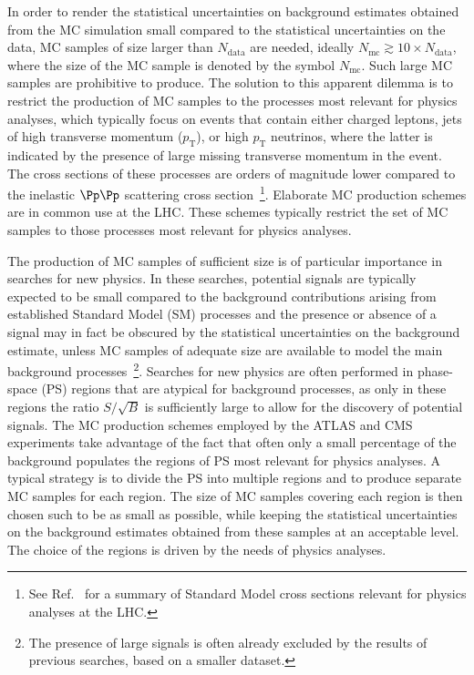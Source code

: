 \documentclass[twocolumn,epjc3]{svjour3}
\newcommand{\pT}{\ensuremath{p_{\textrm{T}}}\xspace}
\newcommand{\data}{\ensuremath{\textrm{data}}\xspace}
\newcommand{\mc}{\ensuremath{\textrm{mc}}\xspace}
\begin{document}
In order to render the statistical uncertainties on background estimates obtained from the MC simulation small compared to the statistical uncertainties on the data,
MC samples of size larger than $N_{\data}$ are needed, ideally $N_{\mc} \gtrsim 10 \times N_{\data}$,
where the size of the MC sample is denoted by the symbol $N_{\mc}$.
Such large MC samples are prohibitive to produce.
The solution to this apparent dilemma is to restrict the production of MC samples to the processes most relevant for physics analyses,
which typically focus on events that contain either charged leptons, jets of high transverse momentum ($\pT$), or high $\pT$ neutrinos,
where the latter is indicated by the presence of large missing transverse momentum in the event.
The cross sections of these processes are orders of magnitude lower compared to the inelastic $\Pp\Pp$ scattering cross section~\footnote{ 
See Ref.~\cite{StandardModelCrossSections} for a summary of Standard Model cross sections relevant for physics analyses at the LHC.}.
Elaborate MC production schemes are in common use at the LHC.
These schemes typically restrict the set of MC samples to those processes most relevant for physics analyses.

The production of MC samples of sufficient size is of particular importance in searches for new physics.
In these searches, potential signals are typically expected to be small
compared to the background contributions arising from established Standard Model (SM) processes
and the presence or absence of a signal may in fact be obscured by the statistical uncertainties on the background estimate,
unless MC samples of adequate size are available to model the main background processes~\footnote{
The presence of large signals is often already excluded by the results of previous searches, based on a smaller dataset.}.
Searches for new physics are often performed in phase-space (PS) regions that are atypical for background processes,
as only in these regions the ratio $S/\sqrt{B}$ is sufficiently large to allow for the discovery of potential signals.
The MC production schemes employed by the ATLAS and CMS experiments take advantage of the fact 
that often only a small percentage of the background populates the regions of PS most relevant for physics analyses.
A typical strategy is to divide the PS into multiple regions and to produce separate MC samples for each region.
The size of MC samples covering each region is then chosen such to be as small as possible,
while keeping the statistical uncertainties on the background estimates obtained from these samples at an acceptable level.
The choice of the regions is driven by the needs of physics analyses.
\end{document}
